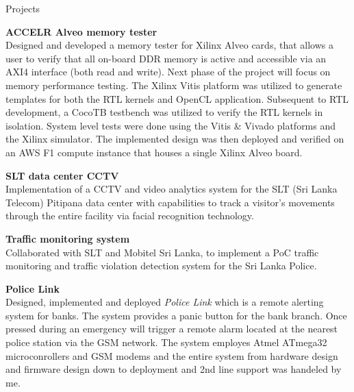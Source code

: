 \documentclass[
	11pt, %
]{resume} %
\begin{document}

\begin{rSection}{Projects}

	\textbf{ACCELR Alveo memory tester} \\
	Designed and developed a memory tester for Xilinx Alveo cards, that allows a user to verify that all on-board DDR memory is active and accessible via an AXI4 interface (both read and write). Next phase of the project will focus on memory performance testing. The Xilinx Vitis platform was utilized to generate templates for both the RTL kernels and OpenCL application. Subsequent to RTL development, a CocoTB testbench was utilized to verify the RTL kernels in isolation. System level tests were done using the Vitis \& Vivado platforms and the Xilinx simulator. The implemented design was then deployed and verified on an AWS F1 compute instance that houses a single Xilinx Alveo board.

	\textbf{SLT data center CCTV} \\
	Implementation of a CCTV and video analytics system for the SLT (Sri Lanka Telecom) Pitipana data center with capabilities to track a visitor's movements through the entire facility via facial recognition technology.

	\textbf{Traffic monitoring system} \\
	Collaborated with SLT and Mobitel Sri Lanka, to implement a PoC traffic monitoring and traffic violation detection system for the Sri Lanka Police.

	\textbf{Police Link} \\
	Designed, implemented and deployed \emph{Police Link} which is a remote alerting system for banks. The system provides a panic button for the bank branch. Once pressed during an emergency will trigger a remote alarm located at the nearest police station via the GSM network. The system employes Atmel ATmega32 microconrollers and GSM modems and the entire system from hardware design and firmware design down to deployment and 2nd line support was handeled by me.

\end{rSection}

\end{document}
